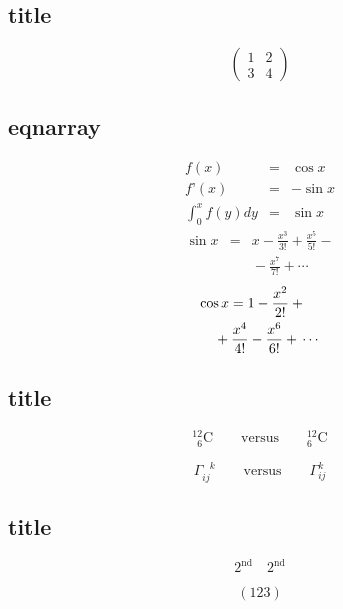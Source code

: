 \documentclass[UTF8]{ctexart}
\begin{document}
\subsection{title}
\begin{displaymath}
\left(\begin{array}{c|c}
1 & 2 \\
\hline
3 & 4
\end{array}\right)
\end{displaymath}

\subsection{eqnarray}
\begin{eqnarray}
f(x) & = & \cos x \\
f’(x) & = & -\sin x \\
\int_{0}^{x} f(y)dy &
= & \sin x
\end{eqnarray}
{\setlength\arraycolsep{2pt}
	\begin{eqnarray}
	\sin x & = & x -\frac{x^{3}}{3!}
	+\frac{x^{5}}{5!}-{}
	\nonumber\\
	& & {}-\frac{x^{7}}{7!}+{}\cdots
	\end{eqnarray}}
\begin{eqnarray}
\lefteqn{ \cos x = 1
	-\frac{x^{2}}{2!} +{} }
\nonumber\\
& & {}+\frac{x^{4}}{4!}
-\frac{x^{6}}{6!}+{}\cdots
\end{eqnarray}
\subsection{title}
\begin{displaymath}
{}^{12}_{\phantom{1}6}\textrm{C}
\qquad \textrm{versus} \qquad
{}^{12}_{6}\textrm{C}
\end{displaymath}

\begin{displaymath}
\Gamma_{ij}^{\phantom{ij}k}
\qquad \textrm{versus} \qquad
\Gamma_{ij}^{k}
\end{displaymath}

\subsection{title}
\begin{equation}
2^{\textrm{nd}} \quad
2^{\mathrm{nd}}
\end{equation}

\[\displaystyle(123)\]
\end{document}
